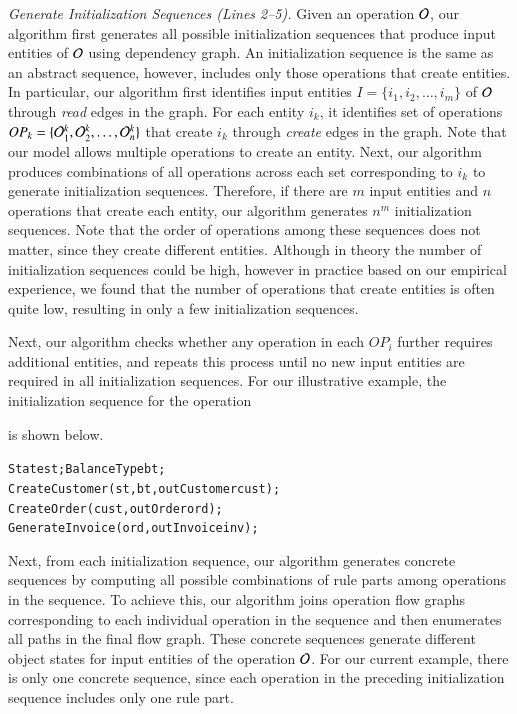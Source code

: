 \textit{Generate Initialization Sequences (Lines 2--5).} Given an operation ${\cal O}$, our algorithm
first generates all possible initialization sequences that produce input entities of ${\cal O}$
using dependency graph. An initialization sequence is the same as an 
abstract sequence, however, includes only those
operations that create entities. In particular, 
our algorithm first identifies input entities 
$I = \{i_1, i_2, \ldots, i_m\}$ of ${\cal O}$ through \textit{read}
edges in the graph. For each entity $i_k$, it identifies set of operations 
$OP_k = \{{\cal O}^k_1, {\cal O}^k_2, \ldots, {\cal O}^k_n\}$
that create $i_k$ through \textit{create} edges in the graph. Note that our model
allows multiple operations to create an entity. Next, our algorithm produces
combinations of all operations across each set corresponding to $i_k$ 
to generate initialization sequences. Therefore, if there are $m$ input entities
and $n$ operations that create each entity, our algorithm generates $n ^ m$
initialization sequences. Note that the order of operations 
among these sequences does not matter, since they create different entities.
Although in theory the number of initialization sequences could be high, however
in practice based on our empirical experience, we found that the number of operations
that create entities is often quite low, resulting in only a few initialization
sequences.

Next, our algorithm checks whether any operation in each $OP_i$
further requires additional entities, and repeats this process until no 
new input entities are required in all initialization sequences. 
For our illustrative example, the initialization sequence for 
the operation \subject{GenerateInvoice} is shown below.

\vspace*{-5pt}
{\small
\begin{alltt}
  State st; BalanceType bt;
  CreateCustomer(st, bt, out Customer cust);  
  CreateOrder(cust, out Order ord);
  GenerateInvoice(ord, out Invoice inv);  
\end{alltt}
}
\vspace*{-5pt}

Next, from each initialization sequence,
our algorithm generates concrete sequences by computing all possible combinations of
rule parts among operations in the sequence. To achieve this, our algorithm
joins operation flow graphs corresponding to each individual operation in the sequence and then
enumerates all paths in the final flow graph. These concrete sequences generate different
object states for input entities of the operation ${\cal O}$. For our current example,
there is only one concrete sequence, since each operation in the
preceding initialization sequence includes only one rule part.


